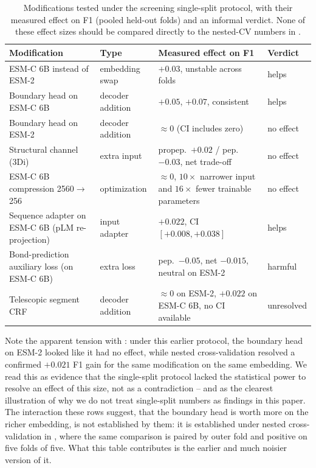 \documentclass{article}
\begin{document}
\begin{table}[h]
\centering
\caption{Modifications tested under the screening single-split protocol, with their measured effect on F1 (pooled held-out folds) and an informal verdict. None of these effect sizes should be compared directly to the nested-CV numbers in .}
\label{tab:verdict}
\small
\begin{tabular}{p{3.4cm} p{2.1cm} p{4.6cm} p{1.7cm}}
\toprule
\textbf{Modification} & \textbf{Type} & \textbf{Measured effect on F1} & \textbf{Verdict} \\
\midrule
ESM-C 6B instead of ESM-2 & embedding swap & $+0.03$, unstable across folds & helps \\
Boundary head on ESM-C 6B & decoder addition & $+0.05$, $+0.07$, consistent & helps \\
Boundary head on ESM-2 & decoder addition & $\approx 0$ (CI includes zero) & no effect \\
Structural channel (3Di) & extra input & propep.\ $+0.02$ / pep.\ $-0.03$, net trade-off & no effect \\
ESM-C 6B compression 2560$\to$256 & optimization & $\approx 0$, $10\times$ narrower input and $16\times$ fewer trainable parameters & no effect \\
Sequence adapter on ESM-C 6B (pLM re-projection) & input adapter & $+0.022$, CI $[+0.008, +0.038]$ & helps \\
Bond-prediction auxiliary loss (on ESM-C 6B) & extra loss & pep.\ $-0.05$, net $-0.015$, neutral on ESM-2 & harmful \\
Telescopic segment CRF & decoder addition & $\approx 0$ on ESM-2, $+0.022$ on ESM-C 6B, no CI available & unresolved \\
\bottomrule
\end{tabular}
\end{table}

Note the apparent tension with : under this earlier protocol, the boundary head on ESM-2 looked like it had no effect, while nested cross-validation resolved a confirmed $+0.021$ F1 gain for the same modification on the same embedding. We read this as evidence that the single-split protocol lacked the statistical power to resolve an effect of this size, not as a contradiction -- and as the clearest illustration of why we do not treat single-split numbers as findings in this paper. The interaction these rows suggest, that the boundary head is worth more on the richer embedding, is not established by them: it is established under nested cross-validation in , where the same comparison is paired by outer fold and positive on five folds of five. What this table contributes is the earlier and much noisier version of it.
\end{document}
